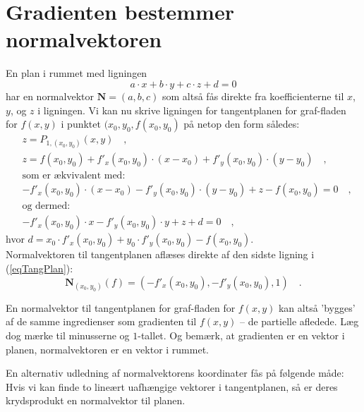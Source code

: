 \section{Gradienten bestemmer normalvektoren}


En plan i rummet med ligningen
\begin{equation}
a\cdot x + b\cdot y + c \cdot z + d = 0
\end{equation}
har en  normalvektor $\mathbf{N} = (a,b,c)$ som altså fås direkte fra koefficienterne  til $x$, $y$, og $z$ i ligningen. Vi kan nu skrive ligningen  for tangentplanen for graf-fladen for $f(x,y)$ i punktet $(x_{0}, y_{0}, f(x_{0}, y_{0})$ på netop den form således:
\begin{equation}\label{eqTangPlan}
\begin{aligned}
& z = P_{1, (x_{0}, y_{0})}(x,y) \quad , \\
& z = f(x_{0}, y_{0}) + f'_{x}(x_{0}, y_{0})\cdot (x-x_{0}) + f'_{y}(x_{0}, y_{0})\cdot (y-y_{0}) \quad , \\
& \textrm{som er ækvivalent med:} \\
& - f'_{x}(x_{0}, y_{0})\cdot (x - x_{0}) - f'_{y}(x_{0}, y_{0})\cdot (y - y_{0}) + z - f(x_{0}, y_{0}) = 0 \quad ,\\
& \textrm{og dermed:}\\
& - f'_{x}(x_{0}, y_{0})\cdot x - f'_{y}(x_{0}, y_{0})\cdot y + z + d = 0 \quad ,
\end{aligned}
\end{equation}
hvor $ d = x_{0}\cdot f'_{x}(x_{0}, y_{0}) + y_{0} \cdot f'_{y}(x_{0}, y_{0}) - f(x_{0}, y_{0})$.\\

Normalvektoren til tangentplanen aflæses direkte af den sidste ligning i (\ref{eqTangPlan}):
\begin{equation}
\mathbf{N}_{(x_{0}, y_{0})}(f) = (- f'_{x}(x_{0}, y_{0}), -f'_{y}(x_{0}, y_{0}), 1 ) \quad .
\end{equation}

\begin{aha}
En normalvektor til tangentplanen for graf-fladen for $f(x,y)$ kan  altså 'bygges' af de samme ingredienser som gradienten til $f(x,y)$ --  de partielle afledede. Læg dog mærke til minusserne og $1$-tallet. Og bemærk, at gradienten er en vektor i planen, normalvektoren er  en vektor i rummet.\\
\end{aha}

En alternativ udledning af normalvektorens koordinater fås på følgende måde: Hvis vi kan finde to lineært uafhængige vektorer i tangentplanen, så er deres krydsprodukt en normalvektor til planen.\\

